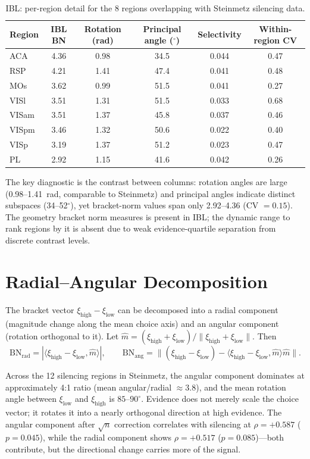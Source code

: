 \documentclass{article}
\begin{document}
\begin{table}[h]
\centering
\caption{IBL: per-region detail for the 8 regions overlapping with Steinmetz silencing data.}
\label{tab:ibl_detail}
\small
\begin{tabular}{lccccc}
\toprule
Region & IBL BN & Rotation (rad) & Principal angle ($^\circ$) & Selectivity & Within-region CV \\
\midrule
ACA & 4.36 & 0.98 & 34.5 & 0.044 & 0.47 \\
RSP & 4.21 & 1.41 & 47.4 & 0.041 & 0.48 \\
MOs & 3.62 & 0.99 & 51.5 & 0.041 & 0.27 \\
VISl & 3.51 & 1.31 & 51.5 & 0.033 & 0.68 \\
VISam & 3.51 & 1.37 & 45.8 & 0.037 & 0.46 \\
VISpm & 3.46 & 1.32 & 50.6 & 0.022 & 0.40 \\
VISp & 3.19 & 1.37 & 51.2 & 0.023 & 0.47 \\
PL & 2.92 & 1.15 & 41.6 & 0.042 & 0.26 \\
\bottomrule
\end{tabular}
\end{table}

The key diagnostic is the contrast between columns: rotation angles are large (0.98--1.41~rad, comparable to Steinmetz) and principal angles indicate distinct subspaces (34--52$^\circ$), yet bracket-norm values span only 2.92--4.36 (CV $= 0.15$). The geometry bracket norm measures is present in IBL; the dynamic range to rank regions by it is absent due to weak evidence-quartile separation from discrete contrast levels.

\section{Radial--Angular Decomposition}
\label{app:decomposition}

The bracket vector $\xi_{\text{high}} - \xi_{\text{low}}$ can be decomposed into a radial component (magnitude change along the mean choice axis) and an angular component (rotation orthogonal to it). Let $\hat{m} = (\xi_{\text{high}} + \xi_{\text{low}}) / \lVert \xi_{\text{high}} + \xi_{\text{low}} \rVert$. Then
\[
\text{BN}_{\text{rad}} = |\langle \xi_{\text{high}} - \xi_{\text{low}}, \hat{m} \rangle|, \qquad
\text{BN}_{\text{ang}} = \lVert (\xi_{\text{high}} - \xi_{\text{low}}) - \langle \xi_{\text{high}} - \xi_{\text{low}}, \hat{m} \rangle \hat{m} \rVert .
\]

Across the 12 silencing regions in Steinmetz, the angular component dominates at approximately 4:1 ratio (mean angular/radial $\approx 3.8$), and the mean rotation angle between $\xi_{\text{low}}$ and $\xi_{\text{high}}$ is $85$--$90^\circ$. Evidence does not merely scale the choice vector; it rotates it into a nearly orthogonal direction at high evidence. The angular component after $\sqrt{n}$ correction correlates with silencing at $\rho = +0.587$ ($p = 0.045$), while the radial component shows $\rho = +0.517$ ($p = 0.085$)---both contribute, but the directional change carries more of the signal.
\end{document}
